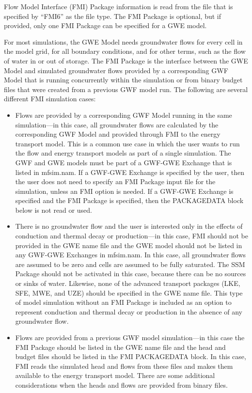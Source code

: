 Flow Model Interface (FMI) Package information is read from the file that is specified by ``FMI6'' as the file type.  The FMI Package is optional, but if provided, only one FMI Package can be specified for a GWE model.

For most simulations, the GWE Model needs groundwater flows for every cell in the model grid, for all boundary conditions, and for other terms, such as the flow of water in or out of storage.  The FMI Package is the interface between the GWE Model and simulated groundwater flows provided by a corresponding GWF Model that is running concurrently within the simulation or from binary budget files that were created from a previous GWF model run.  The following are several different FMI simulation cases:

\begin{itemize}

\item Flows are provided by a corresponding GWF Model running in the same simulation---in this case, all groundwater flows are calculated by the corresponding GWF Model and provided through FMI to the energy transport model.  This is a common use case in which the user wants to run the flow and energy transport models as part of a single simulation.  The GWF and GWE models must be part of a GWF-GWE Exchange that is listed in mfsim.nam.  If a GWF-GWE Exchange is specified by the user, then the user does not need to specify an FMI Package input file for the simulation, unless an FMI option is needed.  If a GWF-GWE Exchange is specified and the FMI Package is specified, then the PACKAGEDATA block below is not read or used.

\item There is no groundwater flow and the user is interested only in the effects of conduction and thermal decay or production---in this case, FMI should not be provided in the GWE name file and the GWE model should not be listed in any GWF-GWE Exchanges in mfsim.nam.  In this case, all groundwater flows are assumed to be zero and cells are assumed to be fully saturated.  The SSM Package should not be activated in this case, because there can be no sources or sinks of water.  Likewise, none of the advanced transport packages (LKE, SFE, MWE, and UZE) should be specified in the GWE name file.  This type of model simulation without an FMI Package is included as an option to represent conduction and thermal decay or production in the absence of any groundwater flow.

\item Flows are provided from a previous GWF model simulation---in this case the FMI Package should be listed in the GWE name file and the head and budget files should be listed in the FMI PACKAGEDATA block.  In this case, FMI reads the simulated head and flows from these files and makes them available to the energy transport model.  There are some additional considerations when the heads and flows are provided from binary files.


\end{itemize}
